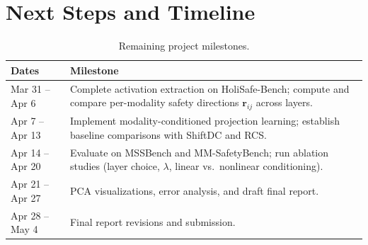 \documentclass{article}
\begin{document}
\section{Next Steps and Timeline}

\begin{table}[h]
\centering
\caption{Remaining project milestones.}
\label{tab:timeline}
\begin{tabular}{lp{9.5cm}}
\toprule
Dates & Milestone \\
\midrule
Mar 31 -- Apr 6
  & Complete activation extraction on HoliSafe-Bench; compute and compare per-modality
    safety directions $\mathbf{r}_{ij}$ across layers. \\
Apr 7 -- Apr 13
  & Implement modality-conditioned projection learning; establish baseline comparisons
    with ShiftDC and RCS. \\
Apr 14 -- Apr 20
  & Evaluate on MSSBench and MM-SafetyBench; run ablation studies (layer choice,
    $\lambda$, linear vs.\ nonlinear conditioning). \\
Apr 21 -- Apr 27
  & PCA visualizations, error analysis, and draft final report. \\
Apr 28 -- May 4
  & Final report revisions and submission. \\
\bottomrule
\end{tabular}
\end{table}



\end{document}
